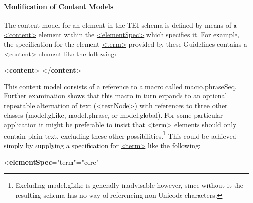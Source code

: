 \paragraph[{Modification of Content Models}]{Modification of Content Models}\label{MDMDCM}\par
The content model for an element in the TEI schema is defined by means of a \hyperref[TEI.content]{<content>} element within the \hyperref[TEI.elementSpec]{<elementSpec>} which specifies it. For example, the specification for the element \hyperref[TEI.term]{<term>} provided by these Guidelines contains a \hyperref[TEI.content]{<content>} element like the following: \par\bgroup{}\exampleFont \begin{shaded}\noindent\mbox{}{<\textbf{content}>}\mbox{}\newline 
{}\mbox{}\newline 
{</\textbf{content}>}\end{shaded}\egroup\par \noindent  This content model consists of a reference to a macro called \textsf{macro.phraseSeq}. Further examination shows that this macro in turn expands to an optional repeatable alternation of text (\hyperref[TEI.textNode]{<textNode>}) with references to three other classes (\textsf{model.gLike}, \textsf{model.phrase}, or \textsf{model.global}). For some particular application it might be preferable to insist that \hyperref[TEI.term]{<term>} elements should only contain plain text, excluding these other possibilities.\footnote{Excluding \textsf{model.gLike} is generally inadvisable however, since without it the resulting schema has no way of referencing non-Unicode characters.} This could be achieved simply by supplying a specification for \hyperref[TEI.term]{<term>} like the following: \par\bgroup{}\exampleFont \begin{shaded}\noindent\mbox{}{<\textbf{elementSpec}\hspace*{1em}{ident}="{term}"\hspace*{1em}{module}="{core}"\mbox{}\newline 
}
\end{shaded}
